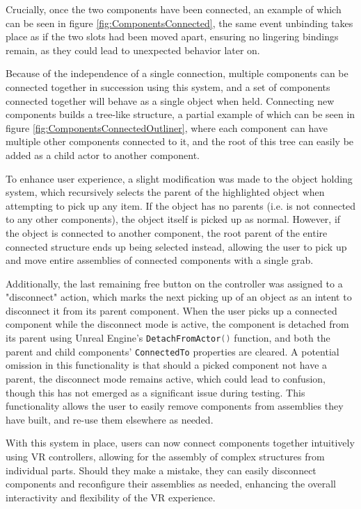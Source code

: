 Crucially, once the two components have been connected, an example of which can be seen in figure \ref{fig:ComponentsConnected}, the same event unbinding takes place as if the two slots had been moved apart, ensuring no lingering bindings remain, as they could lead to unexpected behavior later on.

Because of the independence of a single connection, multiple components can be connected together in succession using this system, and a set of components connected together will behave as a single object when held.
Connecting new components builds a tree-like structure, a partial example of which can be seen in figure \ref{fig:ComponentsConnectedOutliner}, where each component can have multiple other components connected to it, and the root of this tree can easily be added as a child actor to another component.

To enhance user experience, a slight modification was made to the object holding system, which recursively selects the parent of the highlighted object when attempting to pick up any item.
If the object has no parents (i.e. is not connected to any other components), the object itself is picked up as normal.
However, if the object is connected to another component, the root parent of the entire connected structure ends up being selected instead, allowing the user to pick up and move entire assemblies of connected components with a single grab.

Additionally, the last remaining free button on the controller was assigned to a "disconnect" action, which marks the next picking up of an object as an intent to disconnect it from its parent component.
When the user picks up a connected component while the disconnect mode is active, the component is detached from its parent using Unreal Engine's \lstinline[language=C]|DetachFromActor()| function, and both the parent and child components' \lstinline[language=C]|ConnectedTo| properties are cleared.
A potential omission in this functionality is that should a picked component not have a parent, the disconnect mode remains active, which could lead to confusion, though this has not emerged as a significant issue during testing.
This functionality allows the user to easily remove components from assemblies they have built, and re-use them elsewhere as needed.

With this system in place, users can now connect components together intuitively using VR controllers, allowing for the assembly of complex structures from individual parts.
Should they make a mistake, they can easily disconnect components and reconfigure their assemblies as needed, enhancing the overall interactivity and flexibility of the VR experience.